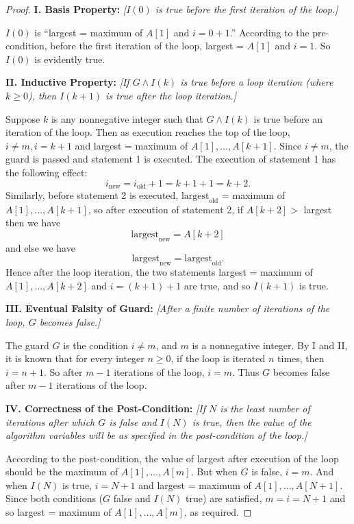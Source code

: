 \documentclass[14pt]{extarticle}
\begin{document}
\begin{proof}
    {\bf I. Basis Property:} {\it [$I(0)$ is true before the first iteration of the loop.]}

    $I(0)$ is “largest = maximum of $A[1]$ and $i = 0+1$.”
    According to the pre-condition, before the first iteration of the loop, largest = $A[1]$ and $i = 1$.
    So $I(0)$ is evidently true.

        {\bf II. Inductive Property:} {\it [If $G \wedge I(k)$ is true before a loop iteration (where $k \geq 0$), then
                $I(k + 1)$ is true after the loop iteration.]}

    Suppose $k$ is any nonnegative integer such that $G \wedge I(k)$ is true before an iteration of the loop. Then as
    execution reaches the top of the loop, $i \neq m, i = k+1$ and largest = maximum of $A[1], \ldots, A[k+1]$.
    Since $i \neq m$, the guard is passed and statement 1 is executed. The execution of statement 1 has the following effect:
    \[
        i_{\text{new}} = i_{\text{old}} + 1 = k + 1 + 1 = k + 2.
    \]
    Similarly, before statement 2 is executed, $\text{largest}_{\text{old}}$ = maximum of $A[1], \ldots, A[k+1]$, so
    after execution of statement 2, if $A[k+2] > $ largest then we have
    \[
        \text{largest}_{\text{new}} = A[k+2]
    \]
    and else we have
    \[
        \text{largest}_{\text{new}} = \text{largest}_{\text{old}}.
    \]
    Hence after the loop iteration, the two statements largest = maximum of $A[1], \ldots, A[k+2]$ and $i = (k + 1) + 1$
    are true, and so $I(k + 1)$ is true.

        {\bf III. Eventual Falsity of Guard:} {\it [After a finite number of iterations of the loop, $G$ becomes false.]}

    The guard $G$ is the condition $i \neq m$, and $m$ is a nonnegative integer. By I and II, it is known that for
    every integer $n \geq 0$, if the loop is iterated $n$ times, then $i = n + 1$. So after $m-1$ iterations of the
    loop, $i = m$. Thus $G$ becomes false after $m-1$ iterations of the loop.

        {\bf IV. Correctness of the Post-Condition:} {\it [If $N$ is the least number of iterations after which $G$ is false
                and $I(N)$ is true, then the value of the algorithm variables will be as specified in the post-condition of the
                loop.]}

    According to the post-condition, the value of largest after execution of the loop should be the maximum of $A[1], \ldots, A[m]$.
    But when $G$ is false, $i = m$. And when $I(N)$ is true, $i = N+1$ and largest = maximum of $A[1], \ldots, A[N+1]$.
    Since both conditions ($G$ false and $I(N)$ true) are satisfied, $m = i = N+1$ and so largest = maximum of $A[1], \ldots, A[m]$, as required.
\end{proof}
\end{document}

